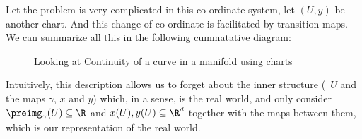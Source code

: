 Let the problem is very complicated in this co-ordinate system, let \((U, y)\) be another chart. And this change of co-ordinate is facilitated by transition maps. We can summarize all this in the following cummatative diagram:
\begin{figure}[H]
	\centering
	\caption{Looking at Continuity of a curve in a manifold using charts}
	\label{fig:chart_application_curves}
\end{figure}

Intuitively, this description allows us to forget about the inner structure (\ie\ \(U\) and the maps \(\gamma\), \(x\) and \(y\)) which, in a sense, is the real world, and only consider \(\preimg_{\gamma}(U) \subseteq \R\) and \(x(U), y(U) \subseteq \R^d\) together with the maps between them, which is our representation of the real world.
